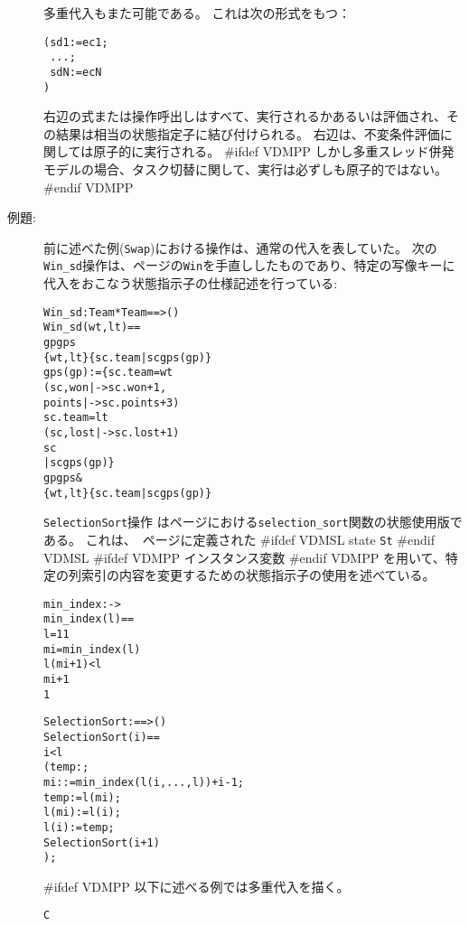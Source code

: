 \documentclass[\pformat,12pt]{jarticle}
\begin{document}
\begin{description}
 多重代入もまた可能である。
これは次の形式をもつ：
  \begin{alltt}
     (sd1 := ec1;
\           ...;
\           sdN := ecN
           )
  \end{alltt}
右辺の式または操作呼出しはすべて、実行されるかあるいは評価され、その結果は相当の状態指定子に結び付けられる。
右辺は、不変条件評価に関しては原子的に実行される。
#ifdef VDMPP
 しかし多重スレッド併発モデルの場合、タスク切替に関して、実行は必ずしも原子的ではない。 
#endif VDMPP

\item[例題:] 前に述べた例(\texttt{Swap})における操作は、通常の代入を表していた。
次の\texttt{Win\_sd}操作は、\pageref{winDef}ページの\texttt{Win}を手直ししたものであり、特定の写像キーに代入をおこなう状態指示子の仕様記述を行っている:
  \begin{alltt}
  Win_sd : Team * Team ==> ()
  Win_sd (wt,lt) ==
     gp  gps  
        \{wt,lt\}  \{sc.team | sc  gps(gp)\}
     gps(gp) := \{  sc.team = wt
                   (sc, won |-> sc.won + 1,
                               points |-> sc.points + 3)
                    sc.team = lt
                   (sc, lost |-> sc.lost + 1)
                    sc 
                 | sc  gps(gp)\}
    gp  gps & 
                 \{wt,lt\}  \{sc.team | sc  gps(gp)\}
  \end{alltt}
\texttt{SelectionSort}操作 は\pageref{selectionSortdef}ページにおける\texttt{selection\_sort}関数の状態使用版である。
これは、~\pageref{stdef}ページに定義された
#ifdef VDMSL
state \texttt{St}
#endif VDMSL
#ifdef VDMPP
インスタンス変数
#endif VDMPP
を用いて、特定の列索引の内容を変更するための状態指示子の使用を述べている。 
  \begin{alltt}
 
  min_index :  -> 
  min_index(l) ==
   l = 1  1
   mi = min_index( l)
      l(mi+1) <  l
        mi+1
        1


  SelectionSort :  ==> ()
  SelectionSort (i) ==
     i <  l
     ( temp: ;
          mi :  := min_index(l(i,..., l)) + i - 1;
         temp := l(mi);
         l(mi) := l(i);
         l(i) := temp;
         SelectionSort(i+1)
        );
  \end{alltt}
#ifdef VDMPP
  以下に述べる例では多重代入を描く。
  \begin{alltt}
   C


\end{alltt}
\end{description}
\end{document}
